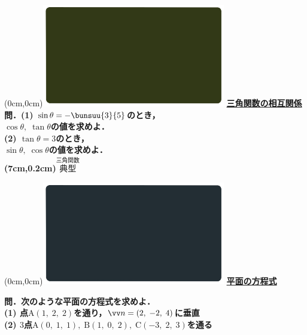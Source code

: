 \documentclass[10pt,
fleqn,
dvipdfmx,
uplatex
]{jsarticle}
\begin{document}
\at(0cm,0cm){\includegraphics[width=8cm,bb=0 0 1920 1080]{./youtube/thumbnails/templates/smart_background/三角関数.jpeg}}
{\color{orange}\bf\boldmath\LARGE\underline{三角関数の相互関係}}\vspace{0.3zw}\\
\Large 
\bf\boldmath 問．(1)  $\sin \theta =-\bunsuu{3}{5}$のとき，\\\hspace{2zw}$\cos \theta ,\;\tan \theta$の値を求めよ．\\
(2)  $\tan \theta =3$のとき，\\\hspace{2zw}$\sin \theta ,\;\cos \theta$の値を求めよ．\\

\at(7cm,0.2cm){\small\color{bradorange}$\overset{\text{三角関数}}{\text{典型}}$}



\newpage



\at(0cm,0cm){\includegraphics[width=8cm,bb=0 0 1920 1080]{./youtube/thumbnails/templates/smart_background/空間ベクトル.jpeg}}
{\color{orange}\bf\boldmath\huge\underline{平面の方程式}}\vspace{0.3zw}

\large 
\bf\boldmath 問．次のような平面の方程式を求めよ．\\
(1)  点$\text{A}\left(1,\;2,\;2\right)$を通り，$\vv n=\left(2,\;-2,\;4\right)$に垂直\\
(2)  $3$点$\text{A}\left(0,\;1,\;1\right),\;\text{B}\left(1,\;0,\;2\right),\;\text{C}\left(-3,\;2,\;3\right)$を通る\\
\end{document}
